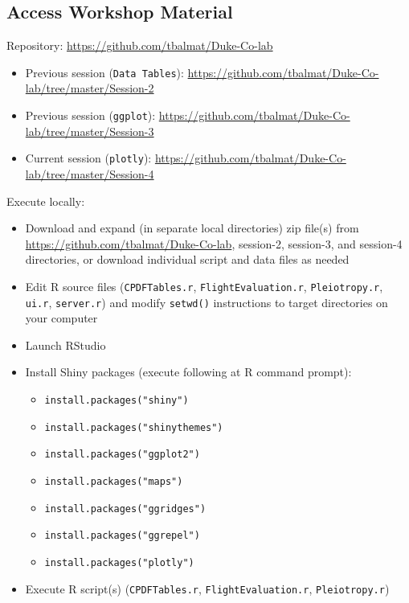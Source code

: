 \documentclass[10pt, letterpaper]{article}
\begin{document}
\begin{spacing}{1.0}

\section{Access Workshop Material}\label{sec:accesworkshopmaterial}

Repository:  \url{https://github.com/tbalmat/Duke-Co-lab}

\begin{itemize}[noitemsep]
    \item Previous session (\texttt{Data Tables}):  \url{https://github.com/tbalmat/Duke-Co-lab/tree/master/Session-2}
    \item Previous session (\texttt{ggplot}):  \url{https://github.com/tbalmat/Duke-Co-lab/tree/master/Session-3}
    \item Current session (\texttt{plotly}):  \url{https://github.com/tbalmat/Duke-Co-lab/tree/master/Session-4}
\end{itemize}

Execute locally:

\begin{itemize}
    \item Download and expand (in separate local directories) zip file(s) from \url{https://github.com/tbalmat/Duke-Co-lab}, session-2, session-3, and session-4 directories, or download individual script and data files as needed
    \item Edit R source files (\texttt{CPDFTables.r}, \texttt{FlightEvaluation.r}, \texttt{Pleiotropy.r}, \texttt{ui.r}, \texttt{server.r}) and modify \texttt{setwd()} instructions to target directories on your computer
    \item Launch RStudio
    \item Install Shiny packages (execute following at R command prompt):
    \begin{itemize}[noitemsep]
        \item \texttt{install.packages("shiny")}
        \item \texttt{install.packages("shinythemes")}
        \item \texttt{install.packages("ggplot2")}
        \item \texttt{install.packages("maps")}
        \item \texttt{install.packages("ggridges")}
        \item \texttt{install.packages("ggrepel")}
        \item \texttt{install.packages("plotly")}
    \end{itemize}
    \item Execute R script(s) (\texttt{CPDFTables.r}, \texttt{FlightEvaluation.r}, \texttt{Pleiotropy.r})
\end{itemize}



\end{spacing}
\end{document}
